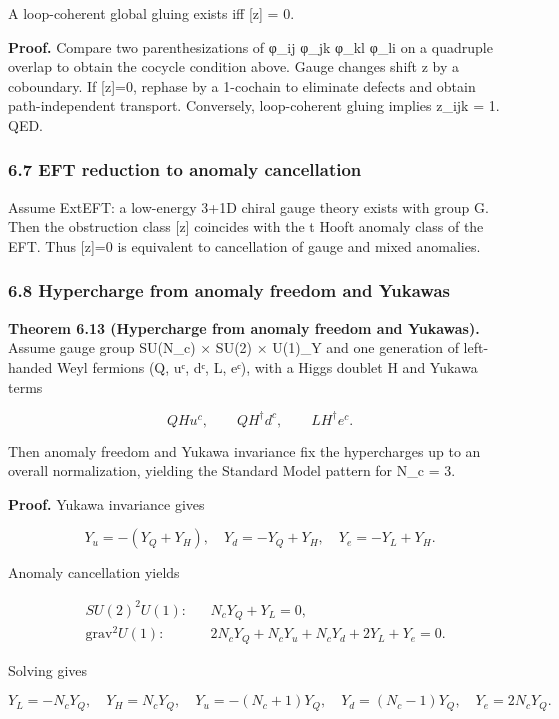 A loop-coherent global gluing exists iff {[}z{]} = 0.

\textbf{Proof.} Compare two parenthesizations of φ\_ij φ\_jk φ\_kl φ\_li on a quadruple overlap to obtain the cocycle condition above. Gauge changes shift z by a coboundary. If {[}z{]}=0, rephase by a 1-cochain to eliminate defects and obtain path-independent transport. Conversely, loop-coherent gluing implies z\_ijk = 1. QED.

\subsubsection{6.7 EFT reduction to anomaly cancellation}\label{67-eft-reduction-to-anomaly-cancellation}

Assume ExtEFT: a low-energy 3+1D chiral gauge theory exists with group G. Then the obstruction class {[}z{]} coincides with the \textquotesingle t Hooft anomaly class of the EFT. Thus {[}z{]}=0 is equivalent to cancellation of gauge and mixed anomalies.

\subsubsection{6.8 Hypercharge from anomaly freedom and Yukawas}\label{68-hypercharge-from-anomaly-freedom-and-yukawas}

\textbf{Theorem 6.13 (Hypercharge from anomaly freedom and Yukawas).} Assume gauge group SU(N\_c) × SU(2) × U(1)\_Y and one generation of left-handed Weyl fermions (Q, uᶜ, dᶜ, L, eᶜ), with a Higgs doublet H and Yukawa terms

\[
Q H u^c,\qquad Q H^\dagger d^c,\qquad L H^\dagger e^c.
\]

Then anomaly freedom and Yukawa invariance fix the hypercharges up to an overall normalization, yielding the Standard Model pattern for N\_c = 3.

\textbf{Proof.} Yukawa invariance gives

\[
Y_u = -(Y_Q + Y_H),\quad
Y_d = -Y_Q + Y_H,\quad
Y_e = -Y_L + Y_H.
\]

Anomaly cancellation yields

\[
\begin{aligned}
&SU(2)^2 U(1): && N_c Y_Q + Y_L = 0,\\
&\mathrm{grav}^2 U(1): && 2 N_c Y_Q + N_c Y_u + N_c Y_d + 2 Y_L + Y_e = 0.
\end{aligned}
\]

Solving gives

\[
Y_L = -N_c Y_Q,\quad
Y_H = N_c Y_Q,\quad
Y_u = -(N_c + 1) Y_Q,\quad
Y_d = (N_c - 1) Y_Q,\quad
Y_e = 2 N_c Y_Q.
\]

